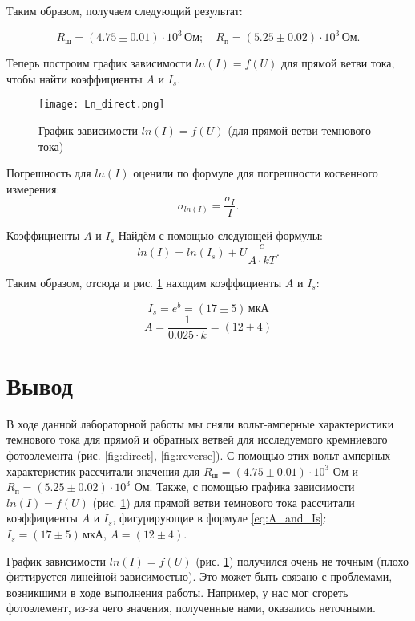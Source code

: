 \documentclass[a4paper,12pt]{article} %
\begin{document}
Таким образом, получаем следующий результат:

\[R_\text{ш} = (4.75 \pm 0.01) \cdot 10^3 \, \text{Ом}; \quad  R_\text{п} = (5.25 \pm 0.02) \cdot 10^3 \, \text{Ом}.\]

Теперь построим график зависимости $ln(I) = f \left( U \right)$ для прямой ветви тока, чтобы найти коэффициенты $A$ и $I_s$.

\begin{figure}[H]
    \centering
    \texttt{[image: Ln\_direct.png]}
    \caption{График зависимости $ln(I) = f \left( U \right)$ (для прямой ветви темнового тока)}
    \label{fig:ln_direct}
\end{figure}

Погрешность для $ln(I)$ оценили по формуле для погрешности косвенного измерения:
\[ \sigma_{ln(I)} = \dfrac{\sigma_I}{I}.\]

Коэффициенты $A$ и $I_s$ Найдём с помощью следующей формулы:
\begin{equation}\label{eq:A_and_Is}
    ln(I) = ln(I_s) + U \dfrac{e}{A \cdot kT}.
\end{equation}

Таким образом, отсюда и рис. \ref{fig:ln_direct} находим коэффициенты $A$ и $I_s$:

\[ I_s = e^b = (17 \pm 5) \, \text{мкА} \]
\[ A = \dfrac{1}{0.025 \cdot k} = (12 \pm 4)\]

\section{Вывод}

В ходе данной лабораторной работы мы сняли вольт-амперные характеристики темнового тока для прямой и обратных ветвей для исследуемого кремниевого фотоэлемента (рис. \ref{fig:direct}, \ref{fig:reverse}). С помощью этих вольт-амперных характеристик рассчитали значения для $R_\text{ш} = (4.75 \pm 0.01) \cdot 10^3$ Ом и $R_\text{п} = (5.25 \pm 0.02) \cdot 10^3$ Ом. Также, с помощью графика зависимости $ln(I) = f \left( U \right)$ (рис. \ref{fig:ln_direct}) для прямой ветви темнового тока рассчитали коэффициенты $A$ и $I_s$, фигурирующие в формуле \ref{eq:A_and_Is}: $I_s = (17 \pm 5) \, \text{мкА}$, $A = (12 \pm 4)$. 

График зависимости $ln(I) = f \left( U \right)$ (рис. \ref{fig:ln_direct}) получился очень не точным (плохо фиттируется линейной зависимостью). Это может быть связано с проблемами, возникшими в ходе выполнения работы. Например, у нас мог сгореть фотоэлемент, из-за чего значения, полученные нами, оказались неточными.
\end{document}
